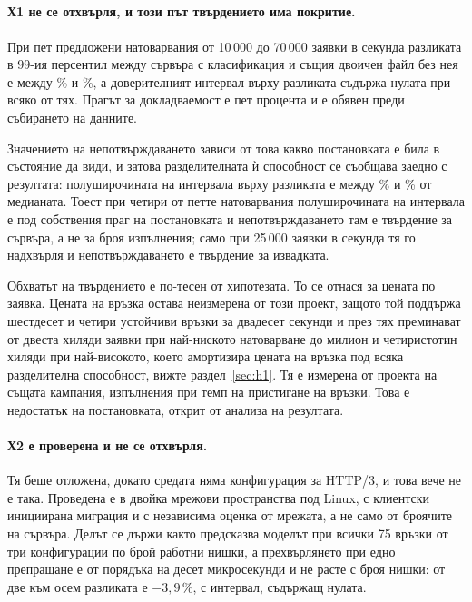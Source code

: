 \subsection*{}

\paragraph{Х1 не се отхвърля, и този път твърдението има покритие.} При пет предложени
натоварвания от 10\,000 до 70\,000 заявки в секунда разликата в 99-ия персентил между
сървъра с класификация и същия двоичен файл без нея е между \% и
\%, а доверителният интервал върху разликата съдържа нулата при всяко
от тях. Прагът за докладваемост е пет процента и е обявен преди събирането на данните.

Значението на непотвърждаването зависи от това какво постановката е била в състояние да
види, и затова разделителната ѝ способност се съобщава заедно с резултата: полуширочината на
интервала върху разликата е между \% и
\% от медианата. Тоест при четири от петте натоварвания
полуширочината на интервала е под собствения праг на постановката и непотвърждаването там е
твърдение за сървъра, а не за броя изпълнения; само при 25\,000 заявки в секунда тя го
надхвърля и непотвърждаването е твърдение за извадката.

Обхватът на твърдението е по-тесен от хипотезата. То се отнася за цената по заявка. Цената
на връзка остава неизмерена от този проект, защото той поддържа шестдесет и четири устойчиви
връзки за двадесет секунди и през тях преминават от двеста хиляди заявки при най-ниското
натоварване до милион и четиристотин хиляди при най-високото, което амортизира цената на
връзка под всяка разделителна способност, вижте раздел~\ref{sec:h1}. Тя е измерена от проекта
 на същата кампания,  изпълнения при темп на пристигане на
връзки. Това е недостатък на постановката, открит от анализа на резултата.

\paragraph{Х2 е проверена и не се отхвърля.} Тя беше отложена, докато средата няма конфигурация за
HTTP/3, и това вече не е така. Проведена е в двойка мрежови пространства под Linux, с клиентски
инициирана миграция и с независима оценка от мрежата, а не само от броячите на сървъра.
Делът се държи както предсказва моделът при всички 75 връзки от три конфигурации по брой
работни нишки, а прехвърлянето при едно препращане е от порядъка на десет микросекунди и не расте с
броя нишки: от две към осем разликата е \(-3{,}9\)\,\%, с интервал, съдържащ нулата.

